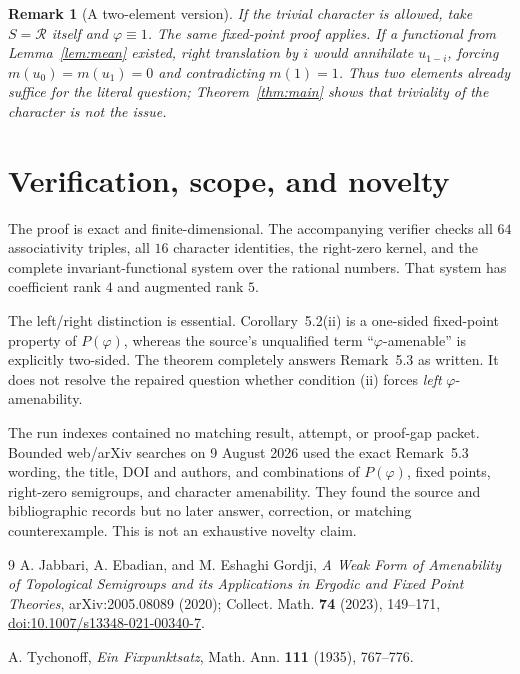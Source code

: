 \documentclass[11pt]{article}
\newtheorem{remark}{Remark}
\newcommand{\R}{\mathcal R}
\begin{document}
\begin{remark}[A two-element version]
If the trivial character is allowed, take $S=\R$ itself and
$\varphi\equiv1$.  The same fixed-point proof applies.  If a functional from
Lemma~\ref{lem:mean} existed, right translation by $i$ would annihilate
$u_{1-i}$, forcing $m(u_0)=m(u_1)=0$ and contradicting $m(1)=1$.  Thus two
elements already suffice for the literal question; Theorem~\ref{thm:main}
shows that triviality of the character is not the issue.
\end{remark}

\section{Verification, scope, and novelty}

The proof is exact and finite-dimensional.  The accompanying verifier checks
all $64$ associativity triples, all $16$ character identities, the right-zero
kernel, and the complete invariant-functional system over the rational
numbers.  That system has coefficient rank $4$ and augmented rank $5$.

The left/right distinction is essential.  Corollary~5.2(ii) is a one-sided
fixed-point property of $P(\varphi)$, whereas the source's unqualified term
``$\varphi$-amenable'' is explicitly two-sided.  The theorem completely
answers Remark~5.3 as written.  It does not resolve the repaired question
whether condition (ii) forces \emph{left} $\varphi$-amenability.

The run indexes contained no matching result, attempt, or proof-gap packet.
Bounded web/arXiv searches on 9 August 2026 used the exact Remark~5.3 wording,
the title, DOI and authors, and combinations of $P(\varphi)$, fixed points,
right-zero semigroups, and character amenability.  They found the source and
bibliographic records but no later answer, correction, or matching
counterexample.  This is not an exhaustive novelty claim.

\begin{thebibliography}{9}
A. Jabbari, A. Ebadian, and M. Eshaghi Gordji,
\emph{A Weak Form of Amenability of Topological Semigroups and its
Applications in Ergodic and Fixed Point Theories},
arXiv:2005.08089 (2020); Collect. Math. \textbf{74} (2023), 149--171,
\href{https://doi.org/10.1007/s13348-021-00340-7}{doi:10.1007/s13348-021-00340-7}.

A. Tychonoff,
\emph{Ein Fixpunktsatz},
Math. Ann. \textbf{111} (1935), 767--776.
\end{thebibliography}
\end{document}
